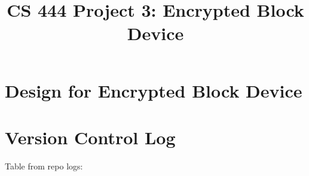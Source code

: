 \documentclass[10pt,letterpaper,draftclsnofoot,onecolumn]{IEEEtran}
\begin{document}

\begin{titlepage}
\title{CS 444 Project 3: Encrypted Block Device}
\author
{
}
    \maketitle
    \vspace{2cm}
    \begin{abstract}
        \noindent 
    \end{abstract}

\end{titlepage}

\section{Design for Encrypted Block Device}

\section{Version Control Log}
\noindent Table from repo logs:
\end{document}
